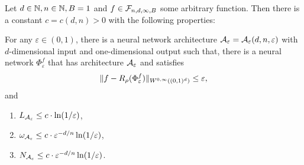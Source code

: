 \begin{theorem} \label{theo: yarotsky}
    Let $d \in \mathbb{N}, n \in \mathbb{N}, B = 1$ and $f \in \mathcal{F}_{n ,d , \infty, B}$ some arbitrary function.
    Then there is a constant $c = c(d, n) > 0$ with the following properties:
    
    For any $\varepsilon \in (0, 1)$, there is a neural network architecture 
    $\mathcal{A}_\varepsilon = \mathcal{A}_\varepsilon(d, n, \varepsilon)$ with $d$-dimensional input and one-dimensional output such
    that, there is a neural network $\Phi_\varepsilon^f$ that has architecture $\mathcal{A}_\varepsilon$ and satisfies
    \begin{equation*}
        \snorm{f - R_\rho(\Phi_\varepsilon^f)}[0][\infty][d] \leq \varepsilon,
    \end{equation*}
    and
    \begin{enumerate}
        \item $L_{\mathcal{A}_\varepsilon} \leq c \cdot \ln(1 / \varepsilon)$,
        \item $\omega_{\mathcal{A}_\varepsilon} \leq c \cdot \varepsilon^{-d/n} \ln(1/\varepsilon)$,
        \item $N_{\mathcal{A}_\varepsilon} \leq c \cdot \varepsilon^{-d/n} \ln(1/\varepsilon)$.
    \end{enumerate}
\end{theorem}
